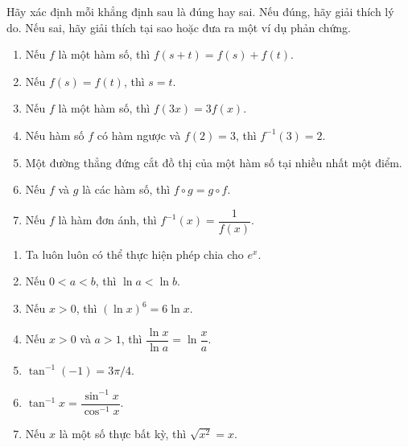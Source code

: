 \noindent
\begin{minipage}[t]{0.485\textwidth}
\fontsize{8.5}{10.8}\selectfont
Hãy xác định mỗi khẳng định sau là đúng hay sai. Nếu đúng, hãy giải thích lý do. Nếu sai, hãy giải thích tại sao hoặc đưa ra một ví dụ phản chứng.

\vspace{0.3em}
\begin{enumerate}[label=\textbf{\arabic*.}, leftmargin=1.4em, itemsep=3.2pt, topsep=1pt, parsep=0pt]
    \item Nếu $f$ là một hàm số, thì $f(s + t) = f(s) + f(t)$.
    \item Nếu $f(s) = f(t)$, thì $s = t$.
    \item Nếu $f$ là một hàm số, thì $f(3x) = 3f(x)$.
    \item Nếu hàm số $f$ có hàm ngược và $f(2) = 3$, thì $f^{-1}(3) = 2$.
    \item Một đường thẳng đứng cắt đồ thị của một hàm số tại nhiều nhất một điểm.
    \item Nếu $f$ và $g$ là các hàm số, thì $f \circ g = g \circ f$.
    \item Nếu $f$ là hàm đơn ánh, thì $f^{-1}(x) = \dfrac{1}{f(x)}$.
\end{enumerate}
\end{minipage}%
\hfill
\begin{minipage}[t]{0.485\textwidth}
\fontsize{8.5}{10.8}\selectfont
\begin{enumerate}[label=\textbf{\arabic*.}, leftmargin=1.4em, itemsep=3.2pt, topsep=0pt, parsep=0pt, start=8]
    \item Ta luôn luôn có thể thực hiện phép chia cho $e^x$.
    \item Nếu $0 < a < b$, thì $\ln a < \ln b$.
    \item Nếu $x > 0$, thì $(\ln x)^6 = 6\ln x$.
    \item Nếu $x > 0$ và $a > 1$, thì $\dfrac{\ln x}{\ln a} = \ln \dfrac{x}{a}$.
    \item $\tan^{-1}(-1) = 3\pi/4$.
    \item $\tan^{-1} x = \dfrac{\sin^{-1} x}{\cos^{-1} x}$.
    \item Nếu $x$ là một số thực bất kỳ, thì $\sqrt{x^2} = x$.
\end{enumerate}
\end{minipage}
